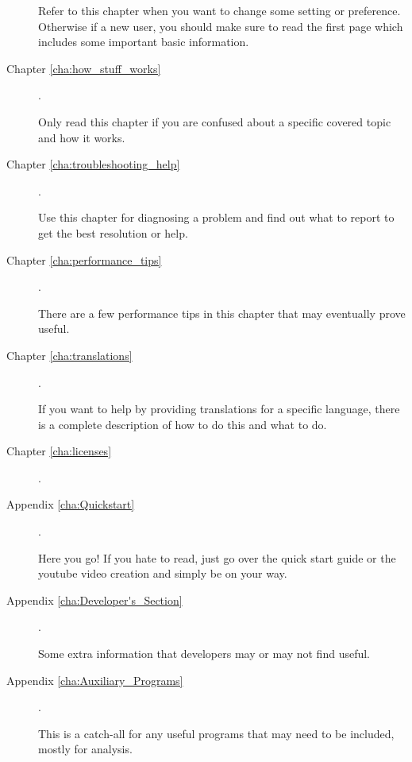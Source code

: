 \begin{description}
        Refer to this chapter when you want to change some setting or preference. 
        Otherwise if a new user, you should make sure to read the first page which includes some important basic information.  

    \item[Chapter \ref{cha:how_stuff_works}] .

        Only read this chapter if you are confused about a specific covered topic and how it works.

    \item[Chapter \ref{cha:troubleshooting_help}] .

        Use this chapter for diagnosing a problem and find out what to report to get the best resolution or help.

    \item[Chapter \ref{cha:performance_tips}]  .

        There are a few performance tips in this chapter that may eventually prove useful.

    \item[Chapter \ref{cha:translations}] .

        If you want to help by providing translations for a specific language, there is a complete description of how to do this and what to do.

    \item[Chapter \ref{cha:licenses}] .

    \item[Appendix \ref{cha:Quickstart}] .

        Here you go! If you hate to read, just go over the quick start guide or the youtube video creation and simply be on your way.

    \item[Appendix \ref{cha:Developer's_Section}] .

        Some extra information that developers may or may not find useful.

    \item[Appendix \ref{cha:Auxiliary_Programs}] .
    
        This is a catch-all for any useful programs that may need to be included, mostly for analysis.

\end{description}


